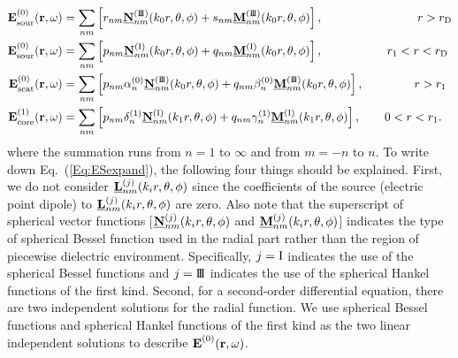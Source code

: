\documentclass[journal=jacsat,manuscript=article,layout=traditional]{achemso}
\newcommand{\norF}[1]{\underline{\vb{#1}}}
\newcommand{\joinR}{\hspace{-.17em}}
\newcommand{\RomanI}{\scriptsize\textrm{I}}
\newcommand{\RomanIII}{\mbox{\RomanI\joinR\RomanI\joinR\RomanI}}
\newcommand{\NRomanI}{\normalsize\textrm{I}}
\newcommand{\NRomanIII}{\mbox{\NRomanI\joinR\NRomanI\joinR\NRomanI}}
\begin{document}
\begin{subequations}
    \begin{align}
            \mathbf{E}_{\textrm{sour}\mathstrut}^{(0)}(\mathbf{r},\omega)
            &= \sum_{nm} \left[r_{nm}\norF{N}_{nm}^{(\RomanIII)}(k_0r,\theta,\phi) + s_{nm}\norF{M}_{nm}^{(\RomanIII)}(k_0r,\theta,\phi)\right], \hspace{2.8 cm} r>r_\mathrm{D}\\
            \mathbf{E}_{\textrm{sour}\mathstrut}^{(0)}(\mathbf{r},\omega)
            &= \sum_{nm} \left[p_{nm}\norF{N}_{nm}^{(\RomanI)}(k_0r,\theta,\phi) + q_{nm}\norF{M}_{nm}^{(\RomanI)}(k_0r,\theta,\phi)\right], \hspace{1.9 cm} r_1<r<r_\mathrm{D}\\
            \mathbf{E}_{\textrm{scat}\mathstrut}^{(0)}(\mathbf{r},\omega)
            &= \sum_{nm} \left[p_{nm}\alpha_n^{(0)}\norF{N}_{nm}^{(\RomanIII)}(k_0r,\theta,\phi) + q_{nm}\beta_n^{(0)}\norF{M}_{nm}^{(\RomanIII)}(k_0r,\theta,\phi)\right], \hspace{1.5 cm} r>r_1\\
            \mathbf{E}_{\textrm{core}\mathstrut}^{(1)}(\mathbf{r},\omega)
            &= \sum_{nm} \left[p_{nm}\delta_n^{(1)}\norF{N}_{nm}^{(\RomanI)}(k_1r,\theta,\phi) + q_{nm}\gamma_n^{(1)}\norF{M}_{nm}^{(\RomanI)}(k_1r,\theta,\phi)\right], \qquad 0<r<r_1.
    \end{align}
    \label{Eq:ESexpand}
\end{subequations}
where the summation runs from $n = 1$ to $\infty$ and from $m = -n$ to $n$.
To write down Eq.~(\ref{Eq:ESexpand}), the following four things should be explained.
First, we do not consider $\norF{L}_{nm}^{(j)}(k_ir,\theta,\phi)$ since the coefficients of the source (electric point dipole) to $\norF{L}_{nm}^{(j)}(k_ir,\theta,\phi)$ are zero.
Also note that the superscript of spherical vector functions [$\norF{N}_{nm}^{(j)}(k_ir,\theta,\phi)$ and $\norF{M}_{nm}^{(j)}(k_ir,\theta,\phi)$] indicates the type of spherical Bessel function used in the radial part rather than the region of piecewise dielectric environment.
Specifically, $j=\NRomanI$ indicates the use of the spherical Bessel functions and $j=\NRomanIII$ indicates the use of the spherical Hankel functions of the first kind.
Second, for a second-order differential equation, there are two independent solutions for the radial function.
We use spherical Bessel functions and spherical Hankel functions of the first kind as the two linear independent solutions to describe $\mathbf{E}_{\mathstrut}^{(0)}(\mathbf{r},\omega)$.
\end{document}

